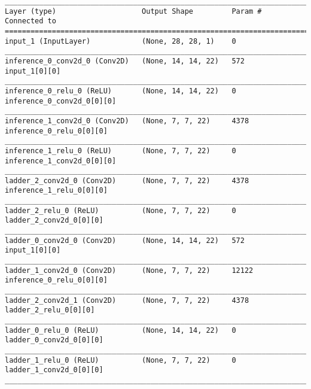 \begin{lstlisting}[caption={\textsc{Mnist}-VLAE-factor-3 Encoder},captionpos=b,basicstyle=\tiny, label={lst:sparsity-vlae-encoder-28-fm3}]
__________________________________________________________________________________________________
Layer (type)                    Output Shape         Param #     Connected to
==================================================================================================
input_1 (InputLayer)            (None, 28, 28, 1)    0
__________________________________________________________________________________________________
inference_0_conv2d_0 (Conv2D)   (None, 14, 14, 22)   572         input_1[0][0]
__________________________________________________________________________________________________
inference_0_relu_0 (ReLU)       (None, 14, 14, 22)   0           inference_0_conv2d_0[0][0]
__________________________________________________________________________________________________
inference_1_conv2d_0 (Conv2D)   (None, 7, 7, 22)     4378        inference_0_relu_0[0][0]
__________________________________________________________________________________________________
inference_1_relu_0 (ReLU)       (None, 7, 7, 22)     0           inference_1_conv2d_0[0][0]
__________________________________________________________________________________________________
ladder_2_conv2d_0 (Conv2D)      (None, 7, 7, 22)     4378        inference_1_relu_0[0][0]
__________________________________________________________________________________________________
ladder_2_relu_0 (ReLU)          (None, 7, 7, 22)     0           ladder_2_conv2d_0[0][0]
__________________________________________________________________________________________________
ladder_0_conv2d_0 (Conv2D)      (None, 14, 14, 22)   572         input_1[0][0]
__________________________________________________________________________________________________
ladder_1_conv2d_0 (Conv2D)      (None, 7, 7, 22)     12122       inference_0_relu_0[0][0]
__________________________________________________________________________________________________
ladder_2_conv2d_1 (Conv2D)      (None, 7, 7, 22)     4378        ladder_2_relu_0[0][0]
__________________________________________________________________________________________________
ladder_0_relu_0 (ReLU)          (None, 14, 14, 22)   0           ladder_0_conv2d_0[0][0]
__________________________________________________________________________________________________
ladder_1_relu_0 (ReLU)          (None, 7, 7, 22)     0           ladder_1_conv2d_0[0][0]
__________________________________________________________________________________________________

\end{lstlisting}
